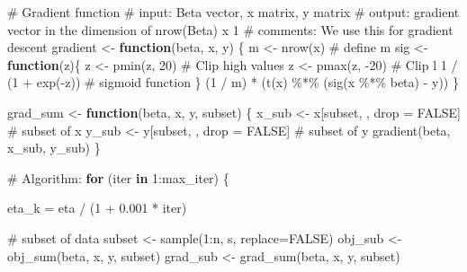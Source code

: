\documentclass[
  letterpaper,
  DIV=11,
  numbers=noendperiod]{scrartcl}
\newenvironment{Shaded}{\begin{snugshade}}{\end{snugshade}}
\newcommand{\AttributeTok}[1]{\textcolor[rgb]{0.40,0.45,0.13}{#1}}
\newcommand{\CommentTok}[1]{\textcolor[rgb]{0.37,0.37,0.37}{#1}}
\newcommand{\ConstantTok}[1]{\textcolor[rgb]{0.56,0.35,0.01}{#1}}
\newcommand{\ControlFlowTok}[1]{\textcolor[rgb]{0.00,0.23,0.31}{\textbf{#1}}}
\newcommand{\DecValTok}[1]{\textcolor[rgb]{0.68,0.00,0.00}{#1}}
\newcommand{\FloatTok}[1]{\textcolor[rgb]{0.68,0.00,0.00}{#1}}
\newcommand{\FunctionTok}[1]{\textcolor[rgb]{0.28,0.35,0.67}{#1}}
\newcommand{\NormalTok}[1]{\textcolor[rgb]{0.00,0.23,0.31}{#1}}
\newcommand{\OtherTok}[1]{\textcolor[rgb]{0.00,0.23,0.31}{#1}}
\newcommand{\SpecialCharTok}[1]{\textcolor[rgb]{0.37,0.37,0.37}{#1}}
\begin{document}
\begin{Shaded}
\begin{Highlighting}[]
  \CommentTok{\# Gradient function}
  \CommentTok{\# input: Beta vector, x matrix, y matrix}
  \CommentTok{\# output: gradient vector in the dimension of nrow(Beta) x 1}
  \CommentTok{\# comments: We use this for gradient descent}
\NormalTok{  gradient }\OtherTok{\textless{}{-}} \ControlFlowTok{function}\NormalTok{(beta, x, y) \{}
\NormalTok{    m }\OtherTok{\textless{}{-}} \FunctionTok{nrow}\NormalTok{(x)                       }\CommentTok{\# define m}
\NormalTok{    sig }\OtherTok{\textless{}{-}} \ControlFlowTok{function}\NormalTok{(z)\{ }
\NormalTok{      z }\OtherTok{\textless{}{-}} \FunctionTok{pmin}\NormalTok{(z, }\DecValTok{20}\NormalTok{)  }\CommentTok{\# Clip high values}
\NormalTok{      z }\OtherTok{\textless{}{-}} \FunctionTok{pmax}\NormalTok{(z, }\SpecialCharTok{{-}}\DecValTok{20}\NormalTok{) }\CommentTok{\# Clip l}
      \DecValTok{1} \SpecialCharTok{/}\NormalTok{ (}\DecValTok{1} \SpecialCharTok{+} \FunctionTok{exp}\NormalTok{(}\SpecialCharTok{{-}}\NormalTok{z))  }\CommentTok{\# sigmoid function}
\NormalTok{    \}}
\NormalTok{    (}\DecValTok{1} \SpecialCharTok{/}\NormalTok{ m) }\SpecialCharTok{*}\NormalTok{ (}\FunctionTok{t}\NormalTok{(x) }\SpecialCharTok{\%*\%}\NormalTok{ (}\FunctionTok{sig}\NormalTok{(x }\SpecialCharTok{\%*\%}\NormalTok{ beta) }\SpecialCharTok{{-}}\NormalTok{ y))}
\NormalTok{  \}}
  
\NormalTok{  grad\_sum }\OtherTok{\textless{}{-}} \ControlFlowTok{function}\NormalTok{(beta, x, y, subset) \{}
\NormalTok{    x\_sub }\OtherTok{\textless{}{-}}\NormalTok{ x[subset, , drop }\OtherTok{=} \ConstantTok{FALSE}\NormalTok{]   }\CommentTok{\# subset of x}
\NormalTok{    y\_sub }\OtherTok{\textless{}{-}}\NormalTok{ y[subset, , drop }\OtherTok{=} \ConstantTok{FALSE}\NormalTok{]   }\CommentTok{\# subset of y}
    \FunctionTok{gradient}\NormalTok{(beta, x\_sub, y\_sub)}
\NormalTok{  \}}

  \CommentTok{\# Algorithm:}
  \ControlFlowTok{for}\NormalTok{ (iter }\ControlFlowTok{in} \DecValTok{1}\SpecialCharTok{:}\NormalTok{max\_iter) \{}

\NormalTok{    eta\_k }\OtherTok{=}\NormalTok{ eta }\SpecialCharTok{/}\NormalTok{ (}\DecValTok{1} \SpecialCharTok{+} \FloatTok{0.001} \SpecialCharTok{*}\NormalTok{ iter)}
    
    \CommentTok{\# subset of data}
\NormalTok{    subset }\OtherTok{\textless{}{-}} \FunctionTok{sample}\NormalTok{(}\DecValTok{1}\SpecialCharTok{:}\NormalTok{n, s, }\AttributeTok{replace=}\ConstantTok{FALSE}\NormalTok{)}
\NormalTok{    obj\_sub }\OtherTok{\textless{}{-}} \FunctionTok{obj\_sum}\NormalTok{(beta, x, y, subset)}
\NormalTok{    grad\_sub }\OtherTok{\textless{}{-}} \FunctionTok{grad\_sum}\NormalTok{(beta, x, y, subset)}
    

\end{Highlighting}
\end{Shaded}
\end{document}
